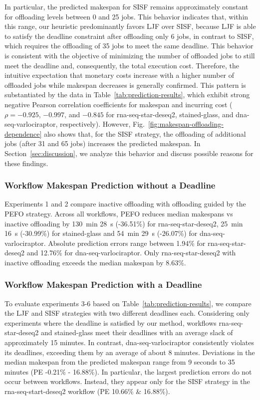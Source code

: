 In particular, the predicted makespan for SISF remains approximately constant for offloading levels between 0 and 25 jobs. This behavior indicates that, within this range, our heuristic predominantly favors LJF over SISF, because LJF is able to satisfy the deadline constraint after offloading only 6 jobs, in contrast to SISF, which requires the offloading of 35 jobs to meet the same deadline. This behavior is consistent with the objective of minimizing the number of offloaded jobs to still meet the deadline and, consequently, the total execution cost. Therefore, the intuitive expectation that monetary costs increase with a higher number of offloaded jobs while makespan decreases is generally confirmed. This pattern is substantiated by the data in Table~\ref{tab:prediction-results}, which exhibit strong negative Pearson correlation coefficients for makespan and incurring cost ($\rho = -0.925$, $-0.997$, and $-0.845$ for rna-seq-star-deseq2, stained-glass, and dna-seq-varlociraptor, respectively). However, Fig.~\ref{fig:makespan-offloading-dependence} also shows that, for the SISF strategy, the offloading of additional jobs (after 31 and 65 jobs) increases the predicted makespan. In Section~\ref{sec:discussion}, we analyze this behavior and discuss possible reasons for these findings.

\subsubsection{Workflow Makespan Prediction without a Deadline\label{subsubsec:offloading-without-deadline}}
Experiments 1 and 2 compare inactive offloading with offloading guided by the PEFO strategy.
Across all workflows, PEFO reduces median makespans vs inactive offloading by 130~min 28~s (-36.51\%) for rna-seq-star-deseq2, 25~min 16~s (-30.99\%) for stained-glass and 54~min 29~s (-26.07\%) for dna-seq-varlociraptor. Absolute prediction errors range between 1.94\% for rna-seq-star-deseq2 and 12.76\% for dna-seq-varlociraptor. Only rna-seq-star-deseq2 with inactive offloading exceeds the median makespan by 8.63\%.

\subsubsection{Workflow Makespan Prediction with a Deadline \label{subsubsec:offloading-with-deadline}}
To evaluate experiments 3-6 based on Table~\ref{tab:prediction-results}, we compare the LJF and SISF strategies with two different deadlines each.
Considering only experiments where the deadline is satisfied by our method, workflows rna-seq-star-deseq2 and stained-glass meet their deadlines with an average slack of approximately 15 minutes. In contrast, dna-seq-varlociraptor consistently violates its deadlines, exceeding them by an average of about 8 minutes.
Deviations in the median makespan from the predicted makespan range from 9 seconds to 35 minutes (PE -0.21\% - 16.88\%).
In particular, the largest prediction errors do not occur between workflows. Instead, they appear only for the SISF strategy in the rna-seq-start-deseq2 workflow (PE 10.66\% \& 16.88\%). 

